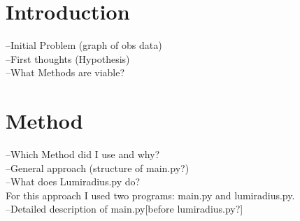 \documentclass[a4paper,10pt]{article}
\date{03/15/15}
\begin{document}
 \section{Introduction}
 --Initial Problem (graph of obs data)\\
 --First thoughts (Hypothesis)\\
 --What Methods are viable?\\
 \section{Method}
 --Which Method did I use and why?\\
 --General approach (structure of main.py?)\\
 --What does Lumiradius.py do?\\
 For this approach I used two programs: main.py and lumiradius.py. \\
 
 --Detailed description of main.py[before lumiradius.py?]\\
 
\end{document}
